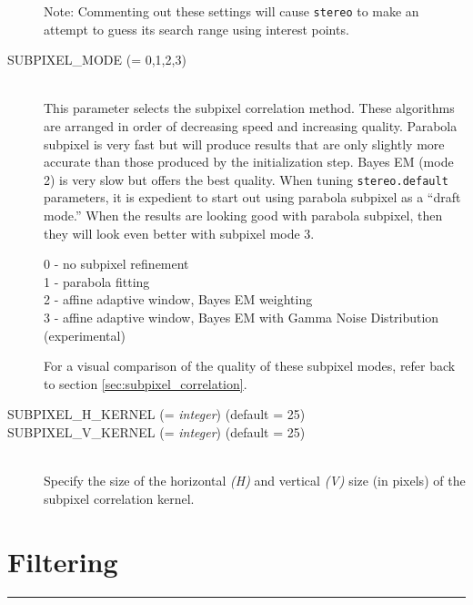 \begin{description}
  Note: Commenting out these settings will cause \texttt{stereo} to make an
  attempt to guess its search range using interest points.

\item[SUBPIXEL\_MODE \textnormal{\small{(= 0,1,2,3)}}] \hfill \\
  This parameter selects the subpixel correlation method. These
  algorithms are arranged in order of decreasing speed and increasing
  quality. Parabola subpixel is very fast but will produce results
  that are only slightly more accurate than those produced by the
  initialization step. Bayes EM (mode 2) is very slow but offers the
  best quality. When tuning {\tt stereo.default} parameters, it is
  expedient to start out using parabola subpixel as a ``draft mode.''
  When the results are looking good with parabola subpixel, then they
  will look even better with subpixel mode 3.

  \begin{description}
    \item[0 - no subpixel refinement]
    \item[1 - parabola fitting ]
    \item[2 - affine adaptive window, Bayes EM weighting ]
    \item[3 - affine adaptive window, Bayes EM with Gamma Noise Distribution (experimental) ]
  \end{description}

  For a visual comparison of the quality of these subpixel modes,
  refer back to section \ref{sec:subpixel_correlation}.

\item[SUBPIXEL\_H\_KERNEL \textnormal{\small{(= \emph{integer})}} (default = 25)]
\item[SUBPIXEL\_V\_KERNEL \textnormal{\small{(= \emph{integer})}} (default = 25)] \hfill \\
  Specify the size of the horizontal \emph{(H)} and vertical
  \emph{(V)} size (in pixels) of the subpixel correlation kernel.

\end{description}


\section{Filtering}
\hrule
\bigskip

